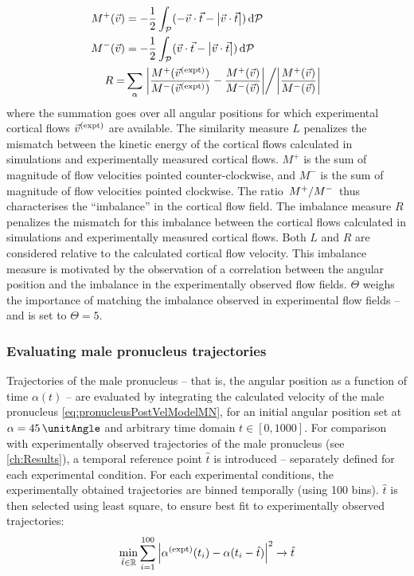 \begin{enumerate}
\begin{align*}
        M^+(\vec{v}) &= -\frac{1}{2}\int_{\mathcal{P}} (-\vec{v}\cdot\vec{t} - \abs{\vec{v}\cdot\vec{t}}) \dd{\mathcal{P}} \\
        M^-(\vec{v}) &= -\frac{1}{2}\int_{\mathcal{P}} (\vec{v}\cdot\vec{t} - \abs{\vec{v}\cdot\vec{t}}) \dd{\mathcal{P}}\\
        R = & \sum_\alpha \flatfrac{\abs{\frac{M^+(\speciesSuper{\vec{v}}{\textrm{expt}})}{M^-(\speciesSuper{\vec{v}}{\textrm{expt}})} - \frac{M^+(\vec{v})}{M^-(\vec{v})}}}{\abs{\frac{M^+(\vec{v})}{M^-(\vec{v})}}} 
    \end{align*}
    where the summation goes over all angular positions for which experimental cortical flows $\vec{v}^{(\textrm{expt})}$ are available. The similarity measure $L$ penalizes the mismatch between the kinetic energy of the cortical flows calculated in simulations and experimentally measured cortical flows. $M^+$ is the sum of magnitude of flow velocities pointed counter-clockwise, and $M^-$ is the sum of magnitude of flow velocities pointed clockwise. The ratio $\flatfrac{M^+}{M^-}$ thus characterises the \enquote{imbalance} in the cortical flow field. The imbalance measure $R$ penalizes the mismatch for this imbalance between the cortical flows calculated in simulations and experimentally measured cortical flows. Both $L$ and $R$ are considered relative to the calculated cortical flow velocity. This imbalance measure is motivated by the observation of a correlation between the angular position and the imbalance in the experimentally observed flow fields. $\Theta$ weighs the importance of matching the imbalance observed in experimental flow fields -- and is set to $\Theta = 5$.
\end{enumerate}

\subsubsection{Evaluating male pronucleus trajectories}
Trajectories of the male pronucleus -- that is, the angular position as a function of time $\alpha(t)$ -- are evaluated by integrating the calculated velocity of the male pronucleus \autoref{eq:pronucleusPostVelModelMN}, for an initial angular position set at $\alpha = \SI{45}{\unitAngle}$ and arbitrary time domain $t \in [0,1000]$. For comparison with experimentally observed trajectories of the male pronucleus (see \autoref{ch:Results}), a temporal reference point $\hat{t}$ is introduced -- separately defined for each experimental condition. For each experimental conditions, the experimentally obtained trajectories are binned temporally (using \num{100} bins). $\hat{t}$ is then selected using least square, to ensure best fit to experimentally observed trajectories:
\begin{equation*}
    \min_{\hat{t} \in \mathbb{R}} \sum_{i=1}^{100} \abs{\alpha^{(\textrm{expt})}(t_i) - \alpha(t_i - \hat{t})}^2 \rightarrow \hat{t}
\end{equation*}